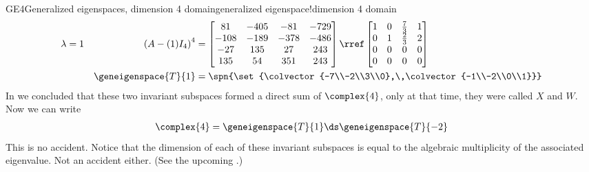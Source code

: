 \begin{example}{GE4}{Generalized eigenspaces, dimension 4 domain}{generalized eigenspace!dimension 4 domain}
\begin{align*}
%
%
\lambda&=1
&
\left(A-(1)I_4\right)^4
&=
\begin{bmatrix}
 81 & -405 & -81 & -729 \\
 -108 & -189 & -378 & -486 \\
 -27 & 135 & 27 & 243 \\
 135 & 54 & 351 & 243
\end{bmatrix}
\rref
\begin{bmatrix}
 1 & 0 & \frac{7}{3} & 1 \\
 0 & 1 & \frac{2}{3} & 2 \\
 0 & 0 & 0 & 0 \\
 0 & 0 & 0 & 0
\end{bmatrix}\\
%
&&
\geneigenspace{T}{1}
&=\spn{\set{\colvector{-7\\-2\\3\\0},\,\colvector{-1\\-2\\0\\1}}}
%
\end{align*}
%
In  we concluded that these two invariant subspaces formed a direct sum of $\complex{4}$, only at that time, they were called $X$ and $W$.  Now we can write
%
\begin{align*}
\complex{4}=\geneigenspace{T}{1}\ds\geneigenspace{T}{-2}
\end{align*}
%
This is no accident.   Notice that the dimension of each of these invariant subspaces is equal to the algebraic multiplicity of the associated eigenvalue.  Not an accident either. (See the upcoming .)
%
\end{example}
%
